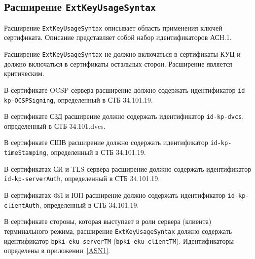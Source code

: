 

\subsection{Расширение \texttt{ExtKeyUsageSyntax}}\label{FMT.Ext.EKU}

Расширение \texttt{ExtKeyUsageSyntax} описывает область применения ключей 
сертификата. Описание представляет собой набор идентификаторов АСН.1. 

Расширение \texttt{ExtKeyUsageSyntax} не должно включаться в сертификаты КУЦ
и должно включаться в сертификаты остальных сторон.
Расширение является критическим.

В сертификате OCSP-сервера расширение должно содержать
идентификатор \verb|id-kp-OCSPSigning|, определенный в СТБ 34.101.19.

В сертификате СЗД расширение должно содержать
идентификатор \verb|id-kp-dvcs|, определенный в СТБ 34.101.dvcs.

В сертификате СШВ расширение должно содержать
идентификатор \verb|id-kp-timeStamping|, определенный в СТБ 34.101.19.

В сертификатах СИ и TLS-сервера расширение должно содержать
идентификатор \verb|id-kp-serverAuth|, определенный в СТБ 34.101.19.

В сертификатах ФЛ и ЮП расширение должно содержать
идентификатор \verb|id-kp-clientAuth|, определенный в СТБ 34.101.19.

В сертификате стороны, которая выступает в роли сервера (клиента) 
терминального режима, расширение \texttt{ExtKeyUsageSyntax} должно содержать 
идентификатор \verb|bpki-eku-serverTM|  
(\verb|bpki-eku-clientTM|). Идентификаторы определены в приложении~\ref{ASN1}.

